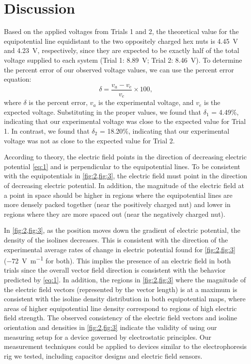\documentclass[10pt,journal,twoside]{IEEEtran}
\begin{document}
\section{Discussion}
Based on the applied voltages from Trials 1 and 2, the theoretical value for the equipotential line equidistant to the two oppositely charged hex nuts is \qty{4.45}{\volt} and \qty{4.23}{\volt}, respectively, since they are expected to be exactly half of the total voltage supplied to each system (Trial 1: \qty{8.89}{\volt}; Trial 2: \qty{8.46}{\volt}). To determine the percent error of our observed voltage values, we can use the percent error equation:
\begin{equation}
\delta = \frac{v_a - v_e}{v_e} \times 100,
\end{equation}
where $\delta$ is the percent error, $v_a$ is the experimental voltage, and $v_e$ is the expected voltage. Substituting in the proper values, we found that $\delta_1$ = 4.49\%, indicating that our experimental voltage was close to the expected value for Trial 1. In contrast, we found that $\delta_2$ = 18.20\%, indicating that our experimental voltage was not as close to the expected value for Trial 2.

According to theory, the electric field points in the direction of decreasing electric potential \cref{eq:1} and is perpendicular to the equipotential lines. %
To be consistent with the equipotentials in \cref{fig:2,fig:3}, the electric field must point in the direction of decreasing electric potential. In addition, the magnitude of the electric field at a point in space should be higher in regions where the equipotential lines are more densely packed together (near the positively charged nut) and lower in regions where they are more spaced out (near the negatively charged nut).

In \cref{fig:2,fig:3}, as the position moves down the gradient of electric potential, the density of the isolines decreases. This is consistent with the direction of the experimental average rates of change in electric potential found for \cref{fig:2,fig:3} (\qty{-72}{\volt\per\meter} for both). This implies the presence of an electric field in both trials since the overall vector field direction is consistent with the behavior predicted by \cref{eq:1}. In addition, the regions in \cref{fig:2,fig:3} where the magnitude of the electric field vectors (represented by the vector length) is at a maximum is consistent with the isoline density distribution in both equipotential maps, where areas of higher equipotential line density correspond to regions of high electric field strength. The observed consistency of the electric field vectors and isoline orientation and densities in \cref{fig:2,fig:3} indicate the validity of using our measuring setup for a device governed by electrostatic principles. Our measurement techniques could be applied to devices similar to the electrophoresis rig we tested, including capacitor designs and electric field sensors. 
\end{document}
